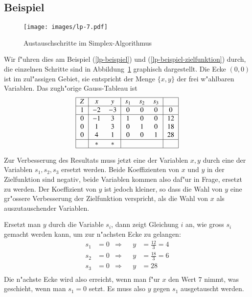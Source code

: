 \subsection{Beispiel}
\begin{figure}
\begin{center}
\texttt{[image: images/lp-7.pdf]}
\end{center}
\caption{Austauschschritte im Simplex-Algorithmus
\label{lp:simplex-steps}}
\end{figure}
Wir f"uhren dies am Beispiel (\ref{lp-beispiel}) und 
(\ref{lp-beispiel-zielfunktion}) durch, die einzelnen Schritte
sind in Abbildung~\ref{lp:simplex-steps} graphisch dargestellt.
Die Ecke $(0,0)$ ist im zul"assigen Gebiet, sie entspricht
der Menge $\{x,y\}$ der frei w"ahlbaren Variablen. Das zugh"orige
Gauss-Tableau ist
\[
\begin{tabular}{|>{$}c<{$}|>{$}c<{$}>{$}c<{$}|>{$}c<{$}>{$}c<{$}>{$}c<{$}|>{$}c<{$}|}
\hline
Z&x&y&s_1&s_2&s_3&\\
\hline
1&-2&-3& 0& 0& 0& 0\\
\hline
0&-1& 3& 1& 0& 0&12\\
0& 1& 3& 0& 1& 0&18\\
0& 4& 1& 0& 0& 1&28\\
\hline
 & *& *&  &  &  &  \\
\hline
\end{tabular}
\]

Zur Verbesserung des Resultats muss jetzt eine der Variablen $x,y$
durch eine der Variablen $s_1,s_2, s_3$ ersetzt werden. Beide
Koeffizienten von $x$ und $y$ in der Zielfunktion sind negativ, 
beide Variablen kommen also daf"ur in Frage, ersetzt zu werden.
Der Koeffizient von $y$ ist jedoch kleiner, so dass die Wahl von $y$
eine gr"ossere Verbesserung der Zielfunktion verspricht, als die
Wahl von $x$ als auszutauschender Variablen.

Ersetzt man $y$ durch die Variable $s_i$, dann zeigt Gleichung
$i$ an, wie gross $s_i$ gemacht werden kann, um zur n"achsten Ecke
zu gelangen:
\begin{align*}
s_1&=0&\Rightarrow&& y&= \frac{12}3=4
\\
s_2&=0&\Rightarrow&& y&= \frac{18}3=6
\\
s_3&=0&\Rightarrow&& y&= 28
\\
\end{align*}
Die n"achste Ecke wird also erreicht, wenn man f"ur $x$ den
Wert $7$ nimmt, was geschieht, wenn man $s_1=0$ setzt.
Es muss also $y$ gegen $s_1$ ausgetauscht werden.


